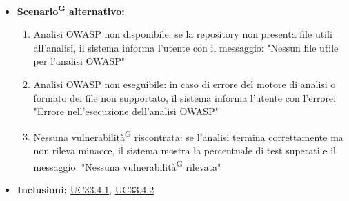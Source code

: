 \documentclass[a4paper, 11pt]{article}
\begin{document}
\begin{itemize}
\begin{enumerate}
    \end{enumerate}
    \item \textbf{Scenario\textsuperscript{G} alternativo:}
	\begin{enumerate}
		\item Analisi OWASP non disponibile: se la repository non presenta file utili all'analisi, il sistema informa l'utente con il messaggio: "Nessun file utile per l'analisi OWASP"
		\item Analisi OWASP non eseguibile: in caso di errore del motore di analisi o formato dei file non supportato, il sistema informa l'utente con l'errore: "Errore nell'esecuzione dell'analisi OWASP"
		\item Nessuna vulnerabilità\textsuperscript{G} riscontrata: se l'analisi termina correttamente ma non rileva minacce, il sistema mostra la percentuale di test superati e il messaggio: "Nessuna vulnerabilità\textsuperscript{G} rilevata"
	\end{enumerate}
    \item \textbf{Inclusioni:} \hyperref[UC33.4.1]{UC33.4.1}, \hyperref[UC33.4.2]{UC33.4.2}
\end{itemize}
\end{document}
